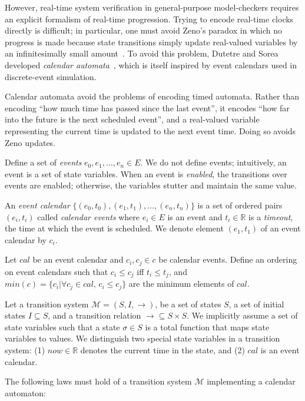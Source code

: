 \documentclass{IEEEtran/IEEEtran}
\begin{document}
However, real-time system verification in general-purpose model-checkers requires an explicit formalism of real-time progression. Trying to encode real-time clocks directly is difficult; in particular, one must avoid Zeno's paradox in which no progress is made because state transitions simply update real-valued variables by an infinitesimally small amount~\cite{bruno,lamport}. To avoid this problem, Dutetre and Sorea developed \emph{calendar automata}~\cite{bruno}, which is itself inspired by event calendars used in discrete-event simulation.

Calendar automata avoid the problems of encoding timed automata. Rather than encoding ``how much time has passed since the last event'', it encodes ``how far into the future is the next scheduled event'', and a real-valued variable representing the current time is updated to the next event time. Doing so avoids Zeno updates.

Define a set of \emph{events} $e_0, e_1, \ldots, e_n \in E$. We do not define events; intuitively, an event is a set of state variables. When an event is \emph{enabled}, the transitions over events are enabled; otherwise, the variables stutter and maintain the same value.

An \emph{event calendar} $\{ (e_0, t_0), (e_1, t_1), \ldots, (e_n, t_n) \}$ is a set of ordered pairs $(e_i, t_i)$ called \emph{calendar events} where $e_i \in E$ is an event and $t_i \in \mathbb{R}$ is a \emph{timeout}, the time at which the event is scheduled. We denote element $(e_1, t_1)$ of an event calendar by $c_i$.

Let $cal$ be an event calendar and $c_i, c_j \in c$ be calendar events. Define an ordering on event calendars such that $c_i \leq c_j$ iff $t_i \leq t_j$, and $min(c) = \{ c_i | \forall c_j \in cal, \, c_i \leq c_j  \}$ are the minimum elements of $cal$.

Let a transition system $\mathcal{M} = (S, I, \rightarrow)$, be a set of states $S$, a set of initial states $I \subseteq S$, and a transition relation $\rightarrow \subseteq S \times S$. We implicitly assume a set of state variables such that a state $\sigma \in S$ is a total function that maps state variables to values. We distinguish two special state variables in a transition system: (1) $now \in \mathbb{R}$ denotes the current time in the state, and (2) $cal$ is an event calendar.

The following laws must hold of a transition system $\mathcal{M}$ implementing a calendar automaton:
\end{document}
